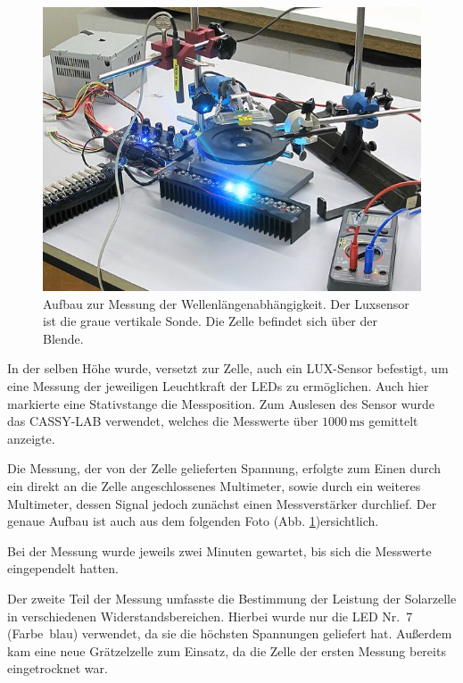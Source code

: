 \documentclass[11pt]{scrartcl}
\newcommand{\unit}[1]{\ensuremath{\,\mathrm{#1}}} %
\begin{document}
\begin{figure}[ht]
\begin{center}
\includegraphics[width=1.0\textwidth]{images/messung_farben.jpg}
\end{center}
\vspace{-1.5\baselineskip}
\caption{Aufbau zur Messung der Wellenlängenabhängigkeit. Der Luxsensor ist die graue vertikale Sonde. Die Zelle befindet sich über der Blende.}
\label{messung_farben}
\end{figure}

In der selben H\"ohe wurde, versetzt zur Zelle, auch ein LUX-Sensor befestigt, um eine Messung der jeweiligen Leuchtkraft der LEDs zu erm\"oglichen. Auch hier markierte eine Stativstange die Messposition. Zum Auslesen des Sensor wurde das CASSY-LAB verwendet, welches die Messwerte \"uber $1000\unit{ms}$ gemittelt anzeigte.

Die Messung, der von der Zelle gelieferten Spannung, erfolgte zum Einen durch ein direkt an die Zelle angeschlossenes Multimeter, sowie durch ein weiteres Multimeter, dessen Signal jedoch zun\"achst einen Messverst\"arker durchlief. Der genaue Aufbau ist auch aus dem folgenden Foto (Abb. \ref{messung_farben})ersichtlich.


Bei der Messung wurde jeweils zwei Minuten gewartet, bis sich die Messwerte eingependelt hatten.

Der zweite Teil der Messung umfasste die Bestimmung der Leistung der Solarzelle in verschiedenen Widerstandsbereichen. Hierbei wurde nur die LED Nr.~7 (Farbe~blau) verwendet, da sie die h\"ochsten Spannungen geliefert hat. Au\ss{}erdem kam eine neue Gr\"atzelzelle zum Einsatz, da die Zelle der ersten Messung bereits eingetrocknet war.
\end{document}

